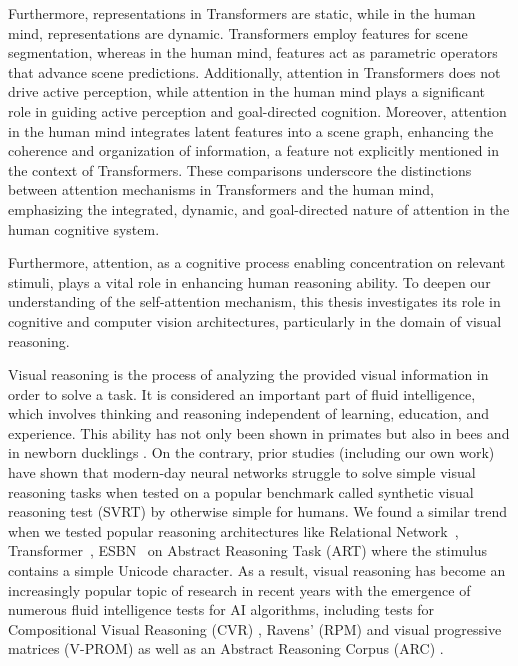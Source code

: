 Furthermore, representations in Transformers are static, while in the human mind, representations are dynamic. Transformers employ features for scene segmentation, whereas in the human mind, features act as parametric operators that advance scene predictions. Additionally, attention in Transformers does not drive active perception, while attention in the human mind plays a significant role in guiding active perception and goal-directed cognition. Moreover, attention in the human mind integrates latent features into a scene graph, enhancing the coherence and organization of information, a feature not explicitly mentioned in the context of Transformers. These comparisons underscore the distinctions between attention mechanisms in Transformers and the human mind, emphasizing the integrated, dynamic, and goal-directed nature of attention in the human cognitive system.

Furthermore, attention, as a cognitive process enabling concentration on relevant stimuli, plays a vital role in enhancing human reasoning ability. To deepen our understanding of the self-attention mechanism, this thesis investigates its role in cognitive and computer vision architectures, particularly in the domain of visual reasoning.

Visual reasoning is the process of analyzing the provided visual information in order to solve a task. It is considered an important part of fluid intelligence, which involves thinking and reasoning independent of learning, education, and experience. This ability has not only been shown in primates \citep{gentner2021learning} but also in bees \citep{giurfa2001concepts} and in newborn ducklings \citep{martinho2016ducklings}. On the contrary, prior studies \citep{Puebla2021.04.06.438551,kim2018not,ricci37same,messina2021solving} (including our own work) have shown that modern-day neural networks struggle to solve simple visual reasoning tasks when tested on a popular benchmark called synthetic visual reasoning test (SVRT) by \citet{fleuret2011comparing} otherwise simple for humans. We found a similar trend when we tested popular reasoning architectures like Relational Network~\citep{santoro2017simple}, Transformer~\citep{vaswani2017attention}, ESBN~\citep{Webb2021EmergentST} on Abstract Reasoning Task (ART) where the stimulus contains a simple Unicode character. As a result, visual reasoning has become an increasingly popular topic of research in recent years with the emergence of numerous fluid intelligence tests for AI algorithms, including tests for Compositional Visual Reasoning (CVR)  \citep{zerroug2022benchmark}, Ravens' (RPM) \citep{barrett2018measuring,zhang2019raven} and visual progressive matrices (V-PROM) \citep{barrett2018measuring,teney2020v} as well as an Abstract Reasoning Corpus (ARC) \citep{chollet2019measure}. 

